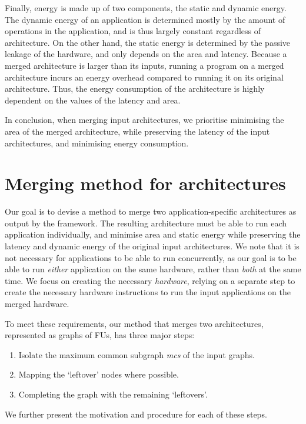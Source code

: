 Finally, energy is made up of two components, the static and dynamic energy. The dynamic energy of an application is determined mostly by the amount of operations in the application, and is thus largely constant regardless of architecture. On the other hand, the static energy is determined by the passive leakage of the hardware, and only depends on the area and latency. Because a merged architecture is larger than its inputs, running a program on a merged architecture incurs an energy overhead compared to running it on its original architecture. Thus, the energy consumption of the architecture is highly dependent on the values of the latency and area.

In conclusion, when merging input architectures, we prioritise minimising the area of the merged architecture, while preserving the latency of the input architectures, and minimising energy consumption.

\section{Merging method for architectures}
\label{method:method}
Our goal is to devise a method to merge two application-specific architectures as output by the \microgenie framework. The resulting architecture must be able to run each application individually, and minimise area and static energy while preserving the latency and dynamic energy of the original input architectures. We note that it is not necessary for applications to be able to run concurrently, as our goal is to be able to run \textit{either} application on the same hardware, rather than \textit{both} at the same time. We focus on creating the necessary \textit{hardware}, relying on a separate step to create the necessary hardware instructions to run the input applications on the merged hardware.

To meet these requirements, our method that merges two architectures, represented as graphs of FUs, has three major steps:
\begin{enumerate}
\item Isolate the maximum common subgraph \textit{mcs} of the input graphs.
\item Mapping the `leftover' nodes where possible.
\item Completing the graph with the remaining `leftovers'.
\end{enumerate}
We further present the motivation and procedure for each of these steps.

